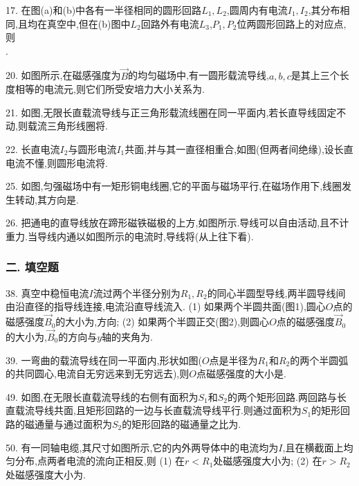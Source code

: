 17. 在图(a)和(b)中各有一半径相同的圆形回路$L_1,L_2$,圆周内有电流$I_1,I_2$,其分布相同,且均在真空中,但在(b)图中$L_2$回路外有电流$L_3$,$P_1,P_2$位两圆形回路上的对应点,则\\.

20. 如图所示,在磁感强度为$\vec B$的均匀磁场中,有一圆形载流导线,$a,b,c$是其上三个长度相等的电流元,则它们所受安培力大小关系为.

21. 如图,无限长直载流导线与正三角形载流线圈在同一平面内,若长直导线固定不动,则载流三角形线圈将.

22. 长直电流$I_2$与圆形电流$I_1$共面,并与其一直径相重合,如图(但两者间绝缘),设长直电流不懂,则圆形电流将.

25. 如图,匀强磁场中有一矩形铜电线圈,它的平面与磁场平行,在磁场作用下,线圈发生转动,其方向是.

26. 把通电的直导线放在蹄形磁铁磁极的上方,如图所示.导线可以自由活动,且不计重力.当导线内通以如图所示的电流时,导线将(从上往下看).

\subsubsection*{二. 填空题}

38. 真空中稳恒电流$I$流过两个半径分别为$R_1,R_2$的同心半圆型导线,两半圆导线间由沿直径的指导线连接,电流沿直导线流入.
    (1) 如果两个半圆共面(图1),圆心$O$点的磁感强度$\vec B_0$的大小为,方向;
    (2) 如果两个半圆正交(图2),则圆心$O$点的磁感强度$\vec B_0$的大小为,$\vec B_0$的方向与$y$轴的夹角为.

39. 一弯曲的载流导线在同一平面内,形状如图($O$点是半径为$R_1$和$R_2$的两个半圆弧的共同圆心,电流自无穷远来到无穷远去),则$O$点磁感强度的大小是.

49. 如图,在无限长直载流导线的右侧有面积为$S_1$和$S_2$的两个矩形回路.两回路与长直载流导线共面,且矩形回路的一边与长直载流导线平行.则通过面积为$S_1$的矩形回路的磁通量与通过面积为$S_2$的矩形回路的磁通量之比为.

50. 有一同轴电缆,其尺寸如图所示,它的内外两导体中的电流均为$I$,且在横截面上均匀分布,点两者电流的流向正相反,则
    (1) 在$r<R_1$处磁感强度大小为;
    (2) 在$r>R_2$处磁感强度大小为.

